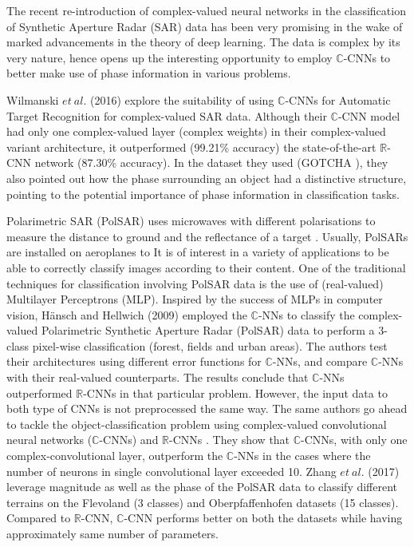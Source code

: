 The recent re-introduction of complex-valued neural networks in the classification of Synthetic Aperture Radar (SAR) data has been very promising in the wake of marked advancements in the theory of deep learning. The data is complex by its very nature, hence opens up the interesting opportunity to employ $\mathbb{C}$-CNNs to better make use of phase information in various problems.

Wilmanski $et \ al.$ (2016) \cite{wilmanski2016complex} explore the suitability of using $\mathbb{C}$-CNNs for Automatic Target Recognition for complex-valued SAR data. Although their $\mathbb{C}$-CNN model had only one complex-valued layer (complex weights) in their complex-valued variant architecture, it outperformed (99.21\% accuracy) the state-of-the-art $\mathbb{R}$-CNN network (87.30\% accuracy). In the dataset they used (GOTCHA \cite{gotcha}), they also pointed out how the phase surrounding an object had a distinctive structure, pointing to the potential importance of phase information in classification tasks.

Polarimetric SAR (PolSAR) uses microwaves with different polarisations to measure the distance to ground and the reflectance of a target \cite{hansch2009classification}. Usually, PolSARs are installed on aeroplanes to It is of interest in a variety of applications to be able to correctly classify images according to their content. One of the traditional techniques for classification involving PolSAR data is the use of (real-valued) Multilayer Perceptrons (MLP). Inspired by the success of MLPs in computer vision, H\"{a}nsch and Hellwich (2009) \cite{hansch2009classification} employed the $\mathbb{C}$-NNs to classify the complex-valued Polarimetric Synthetic Aperture Radar (PolSAR) data to perform a 3-class pixel-wise classification (forest, fields and urban areas). The authors test their architectures using different error functions for $\mathbb{C}$-NNs, and compare $\mathbb{C}$-NNs with their real-valued counterparts. The results conclude that $\mathbb{C}$-NNs outperformed $\mathbb{R}$-CNNs in that particular problem. However, the input data to both type of CNNs is not preprocessed the same way. The same authors go ahead to tackle the object-classification problem using complex-valued convolutional neural networks ($\mathbb{C}$-CNNs) and $\mathbb{R}$-CNNs \cite{hansch2010complex}. They show that $\mathbb{C}$-CNNs, with only one complex-convolutional layer, outperform the $\mathbb{C}$-NNs in the cases where the number of neurons in single convolutional layer exceeded 10. Zhang $et \ al.$ (2017) \cite{polsarzhang2017complex} leverage magnitude as well as the phase of the PolSAR data to classify different terrains on the Flevoland (3 classes) and Oberpfaffenhofen datasets (15 classes). Compared to $\mathbb{R}$-CNN, $\mathbb{C}$-CNN performs better on both the datasets while having approximately same number of parameters.  

